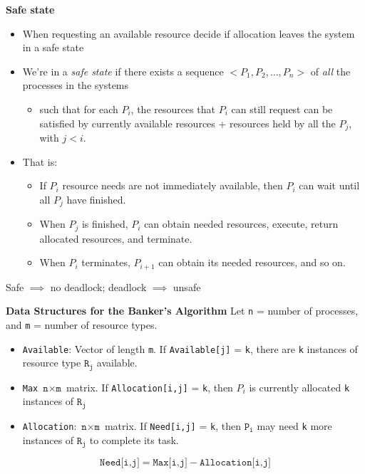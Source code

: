 \documentclass[11pt,a4paper]{article}
\begin{document}
\textbf{Safe state}
\begin{itemize}
    \item When requesting an available resource decide if allocation leaves the system in a
        safe state
    \item We're in a \emph{safe state} if there exists a sequence $<P_1, P_2, \ldots, P_n>$
        of \emph{all} the processes in the systems
        \begin{itemize}
            \item such that for each $P_i$, the resources that $P_i$ can still request can be
                satisfied by currently available resources + resources held by all the $P_j$,
                with $j < i$.
        \end{itemize}
    \item That is:
        \begin{itemize}
            \item If $P_i$ resource needs are not immediately available, then $P_i$
                can wait until all $P_j$ have finished.
            \item When $P_j$ is finished, $P_i$ can obtain needed resources, execute, return
                allocated resources, and terminate.
            \item When $P_i$ terminates, $P_{i+1}$ can obtain its needed resources, and so on.
        \end{itemize}
\end{itemize}
Safe $\implies$ no deadlock; \quad deadlock $\implies$ unsafe

\textbf{Data Structures for the Banker's Algorithm}
Let \texttt{n} = number of processes, and \texttt{m} = number of resource types.
\begin{itemize}
    \item \texttt{Available}: Vector of length \texttt{m}.
        If \texttt{Available[j]} = \texttt{k}, there are \texttt{k} instances of resource type
    $\texttt{R}_\texttt{j}$ available.
    \item \texttt{Max} $\texttt{n} \times \texttt{m}$ matrix.
        If \texttt{Allocation[i,j]} = \texttt{k}, then $P_i$ is currently allocated
        \texttt{k} instances of $\texttt{R}_\texttt{j}$
    \item \texttt{Allocation}: $\texttt{n} \times \texttt{m}$ matrix.
        If \texttt{Need[i,j]} = \texttt{k}, then $\texttt{P}_\texttt{i}$ may need \texttt{k}
        more instances of $\texttt{R}_\texttt{j}$ to complete its task.
\end{itemize}
\[
    \texttt{Need[i,j]} = \texttt{Max[i,j]} - \texttt{Allocation[i,j]}
\]
\end{document}
